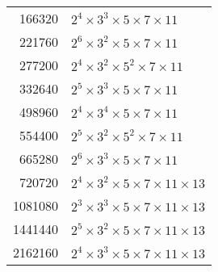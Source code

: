 \documentclass[12pt]{article}
\begin{document}
\begin{tabular}{|r|l|}
166320 & $2^4 \times 3^3 \times 5 \times 7 \times 11$ \\
221760 & $2^6 \times 3^2 \times 5 \times 7 \times 11$ \\
277200 & $2^4 \times 3^2 \times 5^2 \times 7 \times 11$ \\
332640 & $2^5 \times 3^3 \times 5 \times 7 \times 11$ \\
498960 & $2^4 \times 3^4 \times 5 \times 7 \times 11$ \\
554400 & $2^5 \times 3^2 \times 5^2 \times 7 \times 11$ \\
665280 & $2^6 \times 3^3 \times 5 \times 7 \times 11$ \\
720720 & $2^4 \times 3^2 \times 5 \times 7 \times 11 \times 13$ \\
1081080 & $2^3 \times 3^3 \times 5 \times 7 \times 11 \times 13$ \\
1441440 & $2^5 \times 3^2 \times 5 \times 7 \times 11 \times 13$ \\
2162160 & $2^4 \times 3^3 \times 5 \times 7 \times 11 \times 13$ \\
\end{tabular}
\end{document}
